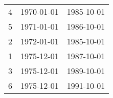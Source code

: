 % 
\begin{tabular}{ccc}
  \hline
  \hline
4 & 1970-01-01 & 1985-10-01 \\ 
  5 & 1971-01-01 & 1986-10-01 \\ 
  2 & 1972-01-01 & 1985-10-01 \\ 
  1 & 1975-12-01 & 1987-10-01 \\ 
  3 & 1975-12-01 & 1989-10-01 \\ 
  6 & 1975-12-01 & 1991-10-01 \\ 
   \hline
\end{tabular}
